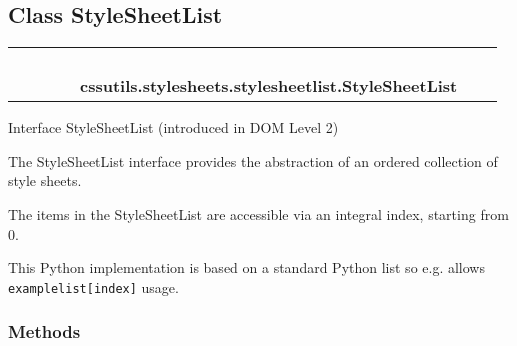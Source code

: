 

\subsection{Class StyleSheetList}

    \label{cssutils:stylesheets:stylesheetlist:StyleSheetList}
\begin{tabular}{cccccccc}
\multicolumn{2}{r}{\settowidth{\BCL}{object}\multirow{2}{\BCL}{object}}
&&
&&
  \\\cline{3-3}
  &&\multicolumn{1}{c|}{}
&&
&&
  \\
\multicolumn{4}{r}{\settowidth{\BCL}{list}\multirow{2}{\BCL}{list}}
&&
  \\\cline{5-5}
  &&&&\multicolumn{1}{c|}{}
&&
  \\
&&&&\multicolumn{2}{l}{\textbf{cssutils.stylesheets.stylesheetlist.StyleSheetList}}
\end{tabular}


Interface StyleSheetList (introduced in DOM Level 2)

The StyleSheetList interface provides the abstraction of an ordered
collection of style sheets.

The items in the StyleSheetList are accessible via an integral index,
starting from 0.

This Python implementation is based on a standard Python list so e.g.
allows \texttt{examplelist{[}index{]}} usage.


  \subsubsection{Methods}

